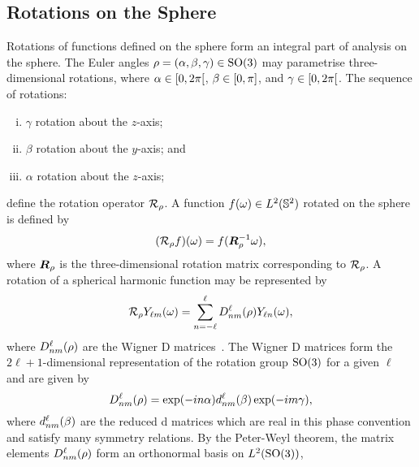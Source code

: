 

\subsection{Rotations on the Sphere}

Rotations of functions defined on the sphere form an integral part of analysis on the sphere.
The Euler angles \(\rho=(\alpha,\beta,\gamma) \in \text{SO(3)}{}\) may parametrise three-dimensional rotations, where \(\alpha \in \interval[open right]{0}{2\pi}\), \(\beta \in \interval{0}{\pi}\), and \(\gamma \in \interval[open right]{0}{2\pi}\).
The sequence of rotations:
%
\begin{enumerate}[(i),nosep,left=\parindent]
	\item \({\gamma}\) rotation about the \(z\)-axis;
	\item \({\beta}\) rotation about the \(y\)-axis; and
	\item \({\alpha}\) rotation about the \(z\)-axis;
\end{enumerate}
%
define the rotation operator \(\mathcal{R}_{\rho}\).
A function \(f(\omega) \in L^{2}(\mathbb{S}^{2})\) rotated on the sphere is defined by
%
\begin{equation}
	(\mathcal{R}_{\rho}f)(\omega)
	= f(\vb*{R}_{\rho}^{-1} \omega),
\end{equation}
%
where \(\vb*{R}_{\rho}{}\) is the three-dimensional rotation matrix corresponding to \(\mathcal{R}_{\rho}\).
A rotation of a spherical harmonic function may be represented by
%
\begin{equation}\label{eq:chapter2_wigner_ylm}
	\mathcal{R}_{\rho} {Y}_{\ell m}(\omega)
	= \displaystyle\sum\limits_{n=-\ell}^{\ell} D^{\ell}_{nm}(\rho) Y_{\ell n}(\omega),
\end{equation}
%
where \(D^{\ell}_{nm}(\rho)\) are the Wigner D matrices~\cite{Brink1993,Ritchie1999}.
The Wigner D matrices form the \(2\ell+1\)-dimensional representation of the rotation group \(\text{SO(3)}{}\) for a given \(\ell{}\) and are given by
%
\begin{equation}
	D^{\ell}_{nm}(\rho)
	= \exp(-i n\alpha) d^{\ell}_{nm}(\beta) \exp(-i m\gamma),
\end{equation}
%
where \(d^{\ell}_{nm}(\beta)\) are the reduced d matrices which are real in this phase convention and satisfy many symmetry relations.
By the Peter-Weyl theorem, the matrix elements \(D^{\ell}_{nm}(\rho)\) form an orthonormal basis on \(L^{2}(\text{SO(3)})\), \ie{}
